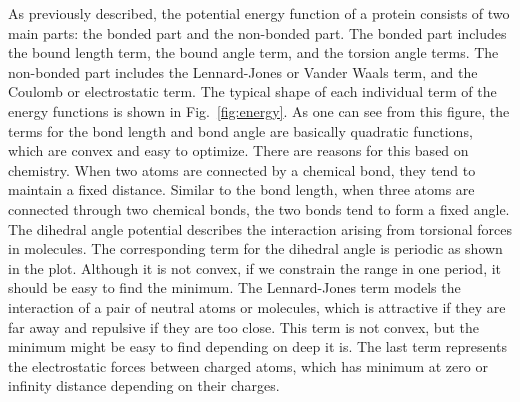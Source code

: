 As previously described, the potential energy function of a protein consists of two main parts: the bonded part and the non-bonded part.
The bonded part includes the bound length term, the bound angle term, and the torsion angle terms. The non-bonded part includes the 
Lennard-Jones or Vander Waals term, and the Coulomb or electrostatic term. The typical shape of each individual term of the energy functions
is shown in Fig.~\ref{fig:energy}. As one can see from this figure, the terms for the bond length and bond angle are basically quadratic functions,
which are convex and easy to optimize. There are  reasons for this based on chemistry. When two atoms are connected by a chemical bond, they 
tend to maintain a fixed distance. Similar to the bond length, when three atoms are connected through two chemical bonds, the two bonds
tend to form a fixed angle.  The dihedral angle potential describes the interaction arising from torsional forces in molecules.
The corresponding term for the dihedral angle is periodic as shown in the plot. Although it is not convex, if we constrain the range in one
period, it should be easy to find the minimum. The Lennard-Jones term models the interaction of a pair of neutral atoms or molecules, which is 
attractive if they are far away and repulsive if they are too close. This term is not convex, but the minimum might be easy to find depending 
on deep it is.  The last term represents the electrostatic forces between charged atoms, which has minimum at zero or infinity distance 
depending on their charges. 




